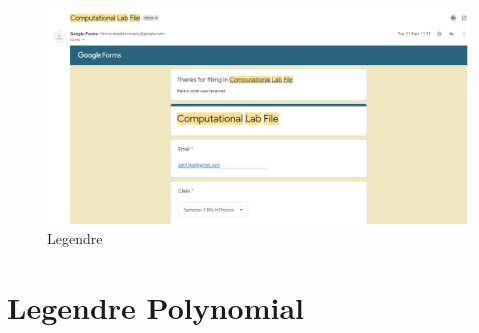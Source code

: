 \documentclass{article}
\begin{document}
\clearpage
\begin{figure}[h]
    \centering
    \includegraphics[width=16cm,height=10cm \textwidth]{2.PNG}
\caption{Legendre}
\end{figure}
\section{Legendre Polynomial}

\end{document}
